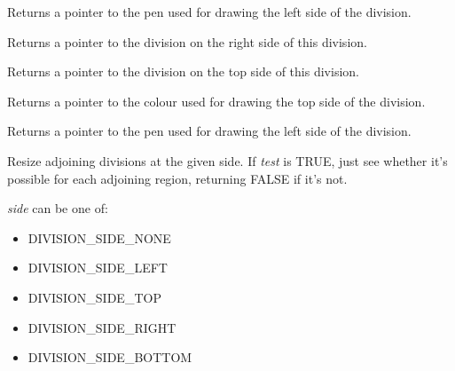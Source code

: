 

Returns a pointer to the pen used for drawing the left side of the division.



Returns a pointer to the division on the right side of this division.



Returns a pointer to the division on the top side of this division.



Returns a pointer to the colour used for drawing the top side of the division.



Returns a pointer to the pen used for drawing the left side of the division.




Resize adjoining divisions at the given side. If {\it test} is TRUE,
just see whether it's possible for each adjoining region,
returning FALSE if it's not.

{\it side} can be one of:

\begin{itemize}\itemsep=0pt
\item DIVISION\_SIDE\_NONE
\item DIVISION\_SIDE\_LEFT
\item DIVISION\_SIDE\_TOP
\item DIVISION\_SIDE\_RIGHT
\item DIVISION\_SIDE\_BOTTOM
\end{itemize}



